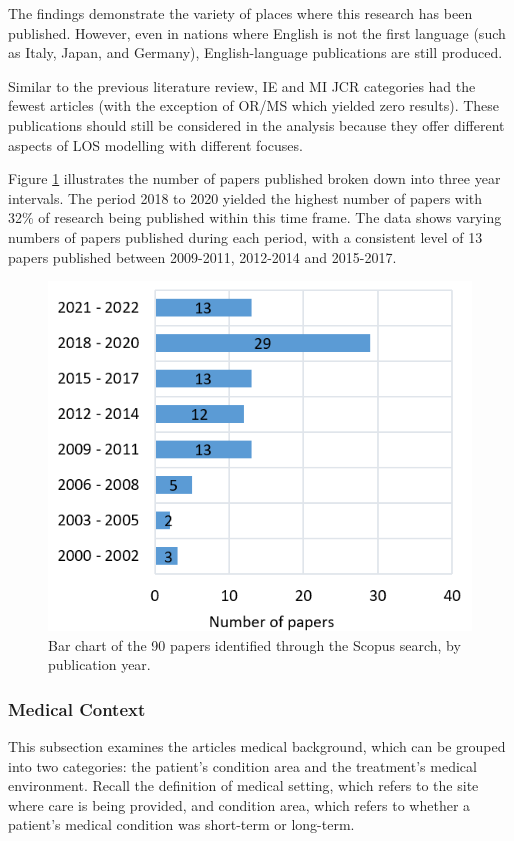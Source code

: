 \documentclass[../thesis.tex]{subfiles}
\begin{document}
The findings demonstrate the variety of places where this research has been published. However, even in nations where English is not the first language (such as Italy, Japan, and Germany), English-language publications are still produced.

Similar to the previous literature review, IE and MI JCR categories had the fewest articles (with the exception of OR/MS which yielded zero results). These publications should still be considered in the analysis because they offer different aspects of LOS modelling with different focuses.

Figure \ref{fig:litreview2-year} illustrates the number of papers published broken down into three year intervals. The period 2018 to 2020 yielded the highest number of papers with 32\% of research being published within this time frame. The data shows varying numbers of papers published during each period, with a consistent level of 13 papers published between 2009-2011, 2012-2014 and 2015-2017.
\begin{figure}[h!]
    \centering
    \includegraphics[scale = 1]{Chapters/Chapter2/Figures3/2lryear.png}
    \caption{Bar chart of the 90 papers identified through the Scopus search, by publication year.}
    \label{fig:litreview2-year}
\end{figure}

\subsubsection{Medical Context}
This subsection examines the articles medical background, which can be grouped into two categories: the patient's condition area and the treatment's medical environment. Recall the definition of medical setting, which refers to the site where care is being provided, and condition area, which refers to whether a patient's medical condition was short-term or long-term.
\end{document}
